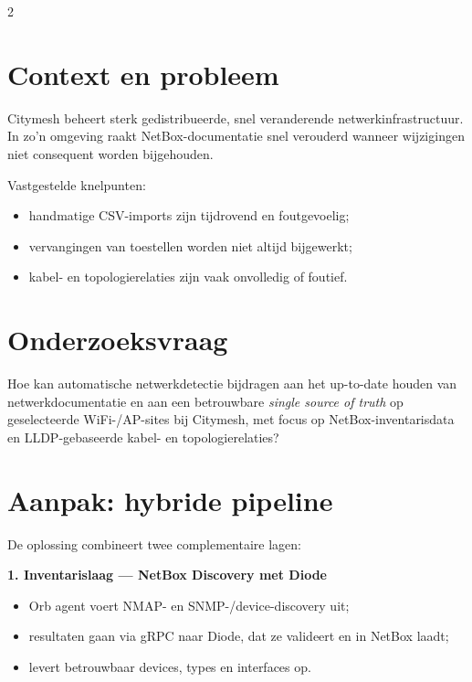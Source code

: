 \documentclass[a0,portrait]{hogent-poster}
\begin{document}
\begin{multicols}{2}

\section{Context en probleem}

Citymesh beheert sterk gedistribueerde, snel veranderende netwerkinfrastructuur. In zo'n omgeving raakt NetBox-documentatie snel verouderd wanneer wijzigingen niet consequent worden bijgehouden.

Vastgestelde knelpunten:
\begin{itemize}
  \item handmatige CSV-imports zijn tijdrovend en foutgevoelig;
  \item vervangingen van toestellen worden niet altijd bijgewerkt;
  \item kabel- en topologierelaties zijn vaak onvolledig of foutief.
\end{itemize}

\section{Onderzoeksvraag}

Hoe kan automatische netwerkdetectie bijdragen aan het up-to-date houden van netwerkdocumentatie en aan een betrouwbare \emph{single source of truth} op geselecteerde WiFi-/AP-sites bij Citymesh, met focus op NetBox-inventarisdata en LLDP-gebaseerde kabel- en topologierelaties?

\section{Aanpak: hybride pipeline}

De oplossing combineert twee complementaire lagen:

\textbf{1. Inventarislaag --- NetBox Discovery met Diode}
\begin{itemize}
  \item Orb agent voert NMAP- en SNMP-/device-discovery uit;
  \item resultaten gaan via gRPC naar Diode, dat ze valideert en in NetBox laadt;
  \item levert betrouwbaar devices, types en interfaces op.
\end{itemize}


\end{multicols}
\end{document}
